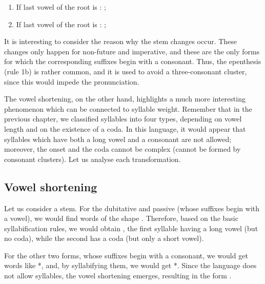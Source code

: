 \begin{refsection}
\begin{mysolution}
\begin{enumerate}
  \begin{enumerate}
  \item If last vowel of the root is : ;
  \item If last vowel of the root is : ;
  \end{enumerate}
\end{enumerate}
\end{mysolution}

\begin{discussion}
\begin{sloppypar}
It is interesting to consider the reason why the stem changes occur. These changes only happen for non-future and imperative, and these are the only forms for which the corresponding suffixes begin with a consonant. Thus, the epenthesis (rule 1b) is rather common, and it is used to avoid a three-consonant cluster, since this would impede the pronunciation.
\end{sloppypar}

The vowel shortening, on the other hand, highlights a much more interesting phenomenon which can be connected to syllable weight. Remember that in the previous chapter, we classified syllables into four types, depending on vowel length and on the existence of a coda. In this language, it would appear that syllables which have both a long vowel and a consonant are not allowed; moreover, the onset and the coda cannot be complex (cannot be formed by consonant clusters). Let us analyse each transformation.

\subsection*{Vowel shortening}
Let us consider a  stem. For the dubitative and passive (whose suffixes begin with a vowel), we would find words of the shape . Therefore, based on the basic syllabification rules, we would obtain , the first syllable having a long vowel (but no coda), while the second has a coda (but only a short vowel).

For the other two forms, whose suffixes begin with a consonant, we would get words like *, and, by syllabifying them, we would get *. Since the language does not allow  syllables, the vowel shortening emerges, resulting in the
form .



\end{discussion}
\end{refsection}
